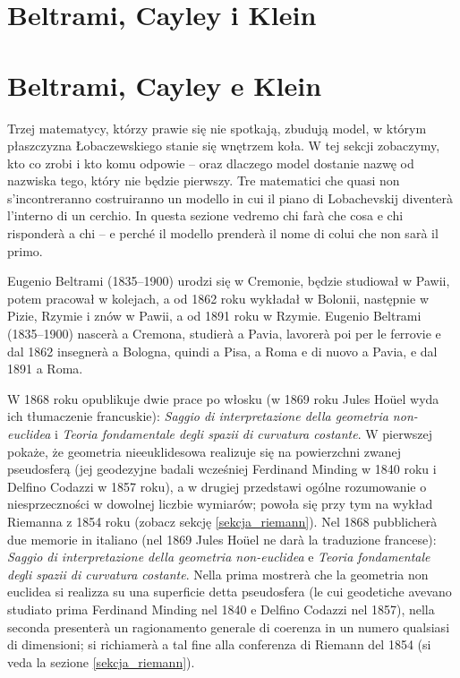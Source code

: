 
\section{Beltrami, Cayley i Klein} %
\section{Beltrami, Cayley e Klein} %
\label{sekcja_beltrami_cayley_klein}

Trzej matematycy, którzy prawie się nie spotkają, zbudują model, w którym płaszczyzna Łobaczewskiego stanie się wnętrzem koła. %
W tej sekcji zobaczymy, kto co zrobi i kto komu odpowie -- oraz dlaczego model dostanie nazwę od nazwiska tego, który nie będzie pierwszy. %
Tre matematici che quasi non s'incontreranno costruiranno un modello in cui il piano di Lobachevskij diventerà l'interno di un cerchio. %
In questa sezione vedremo chi farà che cosa e chi risponderà a chi -- e perché il modello prenderà il nome di colui che non sarà il primo. %

Eugenio Beltrami (1835--1900) urodzi się w Cremonie, będzie studiował w Pawii, potem pracował w kolejach, a od 1862 roku wykładał w Bolonii, następnie w Pizie, Rzymie i znów w Pawii, a od 1891 roku w Rzymie. %
Eugenio Beltrami (1835--1900) nascerà a Cremona, studierà a Pavia, lavorerà poi per le ferrovie e dal 1862 insegnerà a Bologna, quindi a Pisa, a Roma e di nuovo a Pavia, e dal 1891 a Roma. %
%

W 1868 roku opublikuje dwie prace po włosku (w 1869 roku Jules Hoüel wyda ich tłumaczenie francuskie): \emph{Saggio di interpretazione della geometria non-euclidea} i \emph{Teoria fondamentale degli spazii di curvatura costante}. %
W pierwszej pokaże, że geometria nieeuklidesowa realizuje się na powierzchni zwanej pseudosferą (jej geodezyjne badali wcześniej Ferdinand Minding w 1840 roku i Delfino Codazzi w 1857 roku), a w drugiej przedstawi ogólne rozumowanie o niesprzeczności w dowolnej liczbie wymiarów; powoła się przy tym na wykład Riemanna z 1854 roku (zobacz sekcję \ref{sekcja_riemann}). %
Nel 1868 pubblicherà due memorie in italiano (nel 1869 Jules Hoüel ne darà la traduzione francese): \emph{Saggio di interpretazione della geometria non-euclidea} e \emph{Teoria fondamentale degli spazii di curvatura costante}. %
Nella prima mostrerà che la geometria non euclidea si realizza su una superficie detta pseudosfera (le cui geodetiche avevano studiato prima Ferdinand Minding nel 1840 e Delfino Codazzi nel 1857), nella seconda presenterà un ragionamento generale di coerenza in un numero qualsiasi di dimensioni; si richiamerà a tal fine alla conferenza di Riemann del 1854 (si veda la sezione \ref{sekcja_riemann}). %
%
%
%

